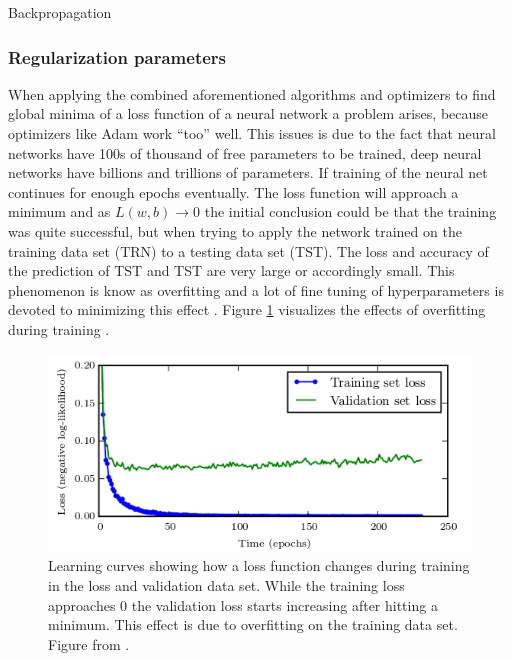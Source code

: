 Backpropagation \cite{rumelhart1988learning}

\subsubsection{Regularization parameters}

When applying the combined aforementioned algorithms and optimizers to find global minima of a loss function of a neural
network a problem arises, because optimizers like Adam work ``too'' well. This issues is due to the fact that neural
networks have 100s of thousand of free parameters to be trained, deep neural networks have billions and trillions of
parameters. If training of the neural net continues for enough epochs eventually. The loss function will approach a
minimum and as $ L(w,b)\rightarrow 0 $ the initial conclusion could be that the training was quite successful, but when
trying to apply the network trained on the training data set (TRN) to a testing data set (TST). The loss and accuracy of
the prediction of TST and TST are very large or accordingly small. This phenomenon is know as overfitting and a lot of
fine tuning of hyperparameters is devoted to minimizing this effect \cite{tetko1995neural}. Figure \ref{fig:overfitting}
visualizes the effects of overfitting during training \cite{goodfellow2016deep}.

\begin{figure}[H]
   \centering \includegraphics[height=.35\textheight, width=1.1\textwidth]{Figures/overfitting} \decoRule
   \caption[Training vs. validation loss over time]{Learning curves showing how a loss function changes during training
     in the loss and validation data set. While the training loss approaches 0 the validation loss starts increasing
     after hitting a minimum. This effect is due to overfitting on the training data set. Figure from
     \cite{goodfellow2016deep}.}
 \label{fig:overfitting}
\end{figure}

